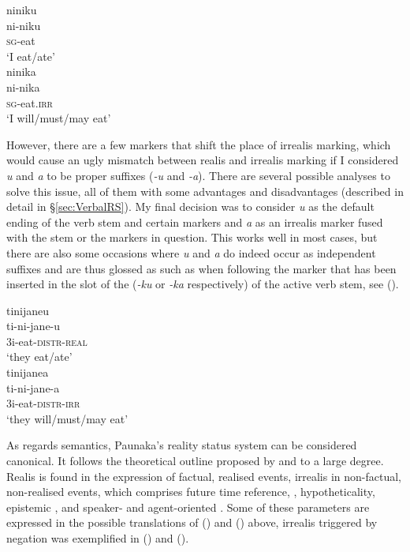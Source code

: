 \ea\label{ex:Sketch-ActRS}
  \ea
\begingl
\glpreamble niniku\\
\gla ni-niku\\
\textsc{sg}-eat\\
\glft ‘I eat/ate’\\
\endgl
  \ex
\begingl
\glpreamble ninika\\
\gla ni-nika\\
\textsc{sg}-eat.\textsc{irr}\\
\glft ‘I will/must/may eat’\\
\endgl
\z
\xe

However, there are a few markers that shift the place of irrealis marking, which would cause an ugly mismatch between realis and irrealis marking if I considered \textit{u} and \textit{a} to be proper suffixes (\textit{-u} and \textit{-a}). There are several possible analyses to solve this issue, all of them with some advantages and disadvantages (described in detail in §\ref{sec:VerbalRS}). My final decision was to consider \textit{u} as the default ending of the verb stem and certain markers and \textit{a} as an irrealis marker fused with the stem or the markers in question. This works well in most cases, but there are also some occasions where \textit{u} and \textit{a} do indeed occur as independent suffixes and are thus glossed as such as when following the  marker that has been inserted in the slot of the  (\textit{-ku} or \textit{-ka} respectively) of the active verb stem, see ().

\ea\label{ex:Sketch-jane-RS}
  \ea
\begingl
\glpreamble tinijaneu\\
\gla ti-ni-jane-u\\
\glb 3i-eat-\textsc{distr}-\textsc{real}\\
\glft ‘they eat/ate’\\
\endgl
  \ex
\begingl
\glpreamble tinijanea\\
\gla ti-ni-jane-a\\
\glb 3i-eat-\textsc{distr}-\textsc{irr}\\
\glft ‘they will/must/may eat’\\
\z
\endgl
\xe
{}

As regards semantics, Paunaka’s reality status system can be considered canonical. It follows the theoretical outline proposed by \citet[]{Elliott2000} and \citet[]{Michael2014} to a large degree. Realis is found in the expression of factual, realised events, irrealis in non-factual, non-realised events, which comprises future time reference, , hypotheticality, epistemic , and speaker- and agent-oriented . Some of these parameters are expressed in the possible translations of () and () above, irrealis triggered by negation was exemplified in () and ().

